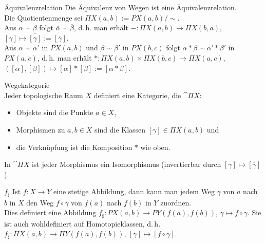 \begin{Lemma}{Äquivalenzrelation}
    Die Äquivalenz von Wegen ist eine Äquivalenzrelation. \\
    Die Quotientenmenge sei $\Pi X(a, b) := PX(a, b) / \sim$. \\
    Aus $\alpha \sim \beta$ folgt $\overline{\alpha} \sim \overline{\beta}$,
    d.\,h. man erhält $-\colon \Pi X(a, b) \rightarrow \Pi X(b, a)$,
    $[\gamma] \mapsto \overline{[\gamma]} := [\overline{\gamma}]$. \\
    Aus $\alpha \sim \alpha'$ in $PX(a, b)$ und $\beta \sim \beta'$ in
    $PX(b, c)$ folgt $\alpha \ast \beta \sim \alpha' \ast \beta'$ in
    $PX(a, c)$, d.\,h. man erhält
    $\ast\colon \Pi X(a, b) \times \Pi X(b, c) \rightarrow \Pi X(a, c)$,
    $([\alpha], [\beta]) \mapsto [\alpha] \ast [\beta] := [\alpha \ast \beta]$.
\end{Lemma}

\linie

\begin{Def}{Wegekategorie}\\
    Jeder topologische Raum $X$ definiert eine Kategorie,
    die  $\cat{\Pi X}$:
    \begin{itemize}
        \item
        Objekte sind die Punkte $a \in X$,

        \item
        Morphismen zu $a, b \in X$ sind die Klassen $[\gamma] \in \Pi X(a, b)$
        und

        \item
        die Verknüpfung ist die Komposition $\ast$ wie oben.
    \end{itemize}
    In $\cat{\Pi X}$ ist jeder Morphismus ein Isomorphismus
    (invertierbar durch $[\gamma] \mapsto [\overline{\gamma}]$).
\end{Def}

\linie

\begin{Def}{$f_\sharp$}
    Ist $f\colon X \rightarrow Y$ eine stetige Abbildung, dann kann
    man jedem Weg $\gamma$ von $a$ nach $b$ in $X$
    den Weg $f \circ \gamma$ von $f(a)$ nach $f(b)$ in $Y$ zuordnen. \\
    Dies definiert eine Abbildung
    $f_\sharp\colon PX(a, b) \rightarrow PY(f(a), f(b))$,
    $\gamma \mapsto f \circ \gamma$.
    Sie ist auch wohldefiniert auf Homotopieklassen, d.\,h.
    $f_\sharp\colon \Pi X(a, b) \rightarrow \Pi Y(f(a), f(b))$,
    $[\gamma] \mapsto [f \circ \gamma]$.
\end{Def}

